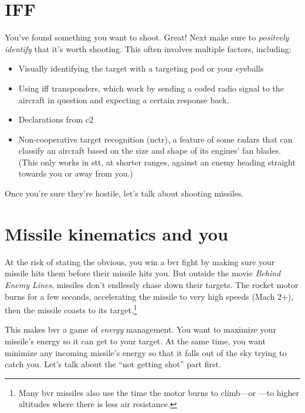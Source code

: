 \section{IFF}

You've found something you want to shoot. Great!
Next make sure to \emph{positvely identify}
that it's worth shooting.
This often involves multiple factors,
including:
\begin{itemize}
\item Visually identifying the target with a targeting pod or your eyeballs
\item Using \ac{iff} transponders, which work by sending a coded radio signal
    to the aircraft in question and expecting a certain response back.
\item Declarations from \ac{c2}
\item Non-cooperative target recognition \ac{(nctr)},
    a feature of some radars that can classify an aircraft based
    on the size and shape of its engines' fan blades.
    (This only works in \ac{stt}, at shorter ranges,
    against an enemy heading straight towards you or away from you.)
\end{itemize}
Once you're sure they're hostile, let's talk about shooting missiles.

\section{Missile kinematics and you}

At the risk of stating the obvious, you win a \ac{bvr} fight by making sure your
missile hits them before their missile hits you.
But outside the movie \emph{Behind Enemy Lines},
missiles don't endlessly chase down their targets.
The rocket motor burns for a few seconds,
accelerating the missile to very high speeds (Mach 2+),
then the missile coasts to its target.\punckern\footnote{Many
\ac{bvr} missiles also use the time the motor burns to climb---or
---to higher altitudes where there is less air resistance.}

This makes \ac{bvr} a game of \emph{energy} management.
You want to maximize your missile's energy so it can get to your target.
At the same time, you want minimize any incoming missile's energy
so that it falls out of the sky trying to catch you.
Let's talk about the ``not getting shot'' part first.

